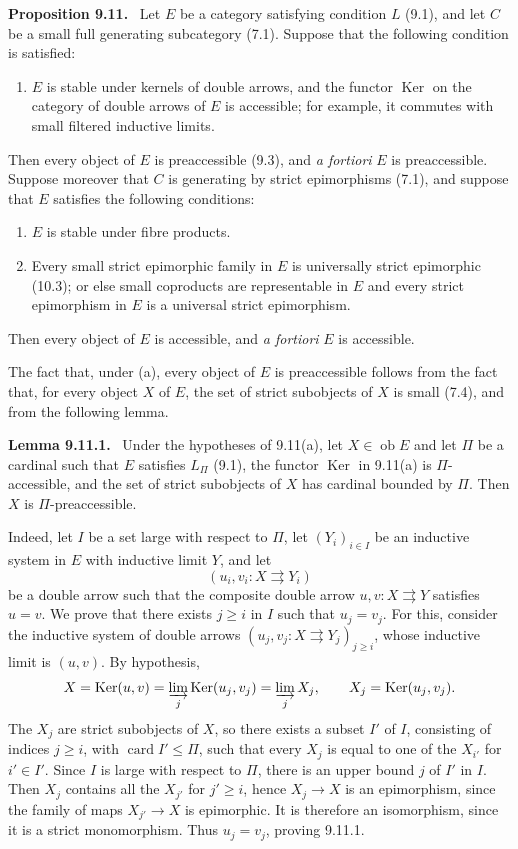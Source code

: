 \documentclass[11pt]{article}
\newcommand{\ob}{\operatorname{ob}}
\newcommand{\Ker}{\operatorname{Ker}}
\newcommand{\card}{\operatorname{card}}
\newenvironment{statement}[1]{\par\medskip\noindent\textbf{#1.}\ }{\par\medskip}
\begin{document}
\begin{statement}{Proposition 9.11}
Let $E$ be a category satisfying condition $L$ (9.1), and let $C$ be a small full generating subcategory (7.1). Suppose that the following condition is satisfied:
\begin{enumerate}[label=\alph*)]
\item $E$ is stable under kernels of double arrows, and the functor $\Ker$ on the category of double arrows of $E$ is accessible; for example, it commutes with small filtered inductive limits.
\end{enumerate}
Then every object of $E$ is preaccessible (9.3), and \emph{a fortiori} $E$ is preaccessible. Suppose moreover that $C$ is generating by strict epimorphisms (7.1), and suppose that $E$ satisfies the following conditions:
\begin{enumerate}[label=\alph*),resume]
\item $E$ is stable under fibre products.
\item Every small strict epimorphic family in $E$ is universally strict epimorphic (10.3); or else small coproducts are representable in $E$ and every strict epimorphism in $E$ is a universal strict epimorphism.
\end{enumerate}
Then every object of $E$ is accessible, and \emph{a fortiori} $E$ is accessible.
\end{statement}

The fact that, under (a), every object of $E$ is preaccessible follows from the fact that, for every object $X$ of $E$, the set of strict subobjects of $X$ is small (7.4), and from the following lemma.

\begin{statement}{Lemma 9.11.1}
Under the hypotheses of 9.11(a), let $X\in\ob E$ and let $\Pi$ be a cardinal such that $E$ satisfies $L_\Pi$ (9.1), the functor $\Ker$ in 9.11(a) is $\Pi$-accessible, and the set of strict subobjects of $X$ has cardinal bounded by $\Pi$. Then $X$ is $\Pi$-preaccessible.
\end{statement}

Indeed, let $I$ be a set large with respect to $\Pi$, let $(Y_i)_{i\in I}$ be an inductive system in $E$ with inductive limit $Y$, and let
\[
 (u_i,v_i:X\rightrightarrows Y_i)
\]
be a double arrow such that the composite double arrow $u,v:X\rightrightarrows Y$ satisfies $u=v$. We prove that there exists $j\geq i$ in $I$ such that $u_j=v_j$. For this, consider the inductive system of double arrows $(u_j,v_j:X\rightrightarrows Y_j)_{j\geq i}$, whose inductive limit is $(u,v)$. By hypothesis,
\[
 X=\Ker(u,v)=\varinjlim_j \Ker(u_j,v_j)=\varinjlim_j X_j,
 \qquad X_j=\Ker(u_j,v_j).
\]
The $X_j$ are strict subobjects of $X$, so there exists a subset $I'$ of $I$, consisting of indices $j\geq i$, with $\card I'\leq\Pi$, such that every $X_j$ is equal to one of the $X_{i'}$ for $i'\in I'$. Since $I$ is large with respect to $\Pi$, there is an upper bound $j$ of $I'$ in $I$. Then $X_j$ contains all the $X_{j'}$ for $j'\geq i$, hence $X_j\to X$ is an epimorphism, since the family of maps $X_{j'}\to X$ is epimorphic. It is therefore an isomorphism, since it is a strict monomorphism. Thus $u_j=v_j$, proving 9.11.1.
\end{document}
